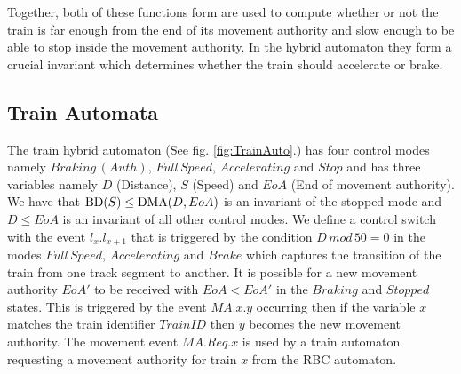 Together, both of these functions form are used to compute whether or not the train is far enough from the end of its movement authority and slow enough to be able to stop inside the movement authority. In the hybrid automaton they form a crucial invariant which determines whether the train should accelerate or brake.

\subsection*{Train Automata}

The train hybrid automaton (See fig. \ref{fig:TrainAuto}.) has four control modes namely $Braking \, (Auth)$, $Full \, Speed$, $Accelerating$ and $Stop$ and has three variables namely $D$ (Distance),  $S$ (Speed) and $EoA$ (End of movement authority). We have that $ \mathrm{BD}(S) \leq \mathrm{DMA}(D,EoA)$ is an invariant of the stopped mode and $D \leq EoA$ is an invariant of all other control modes. We define a control switch with the event $l_x.l_{x+1}$ that is triggered by the condition $D \, mod \, 50 = 0$ in the modes $Full \, Speed$, $Accelerating$ and $Brake$ which captures the transition of the train from one track segment to another. It is possible for a new movement authority $EoA'$ to be received with $EoA < EoA'$  in the $Braking$ and $Stopped$ states.  This is triggered by the event $MA.x.y$ occurring then if the variable $x$ matches the train identifier $TrainID$ then $y$ becomes the new movement authority. The movement event $MA.Req.x$ is used by a train automaton requesting a movement authority for train $x$ from the RBC automaton. 
\medskip



